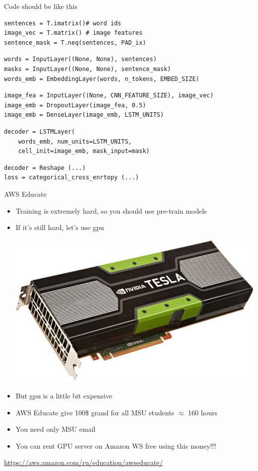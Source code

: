 \documentclass{beamer}
\begin{document}
\begin{frame}[fragile]{Code should be like this}
\begin{verbatim}
sentences = T.imatrix()# word ids
image_vec = T.matrix() # image features
sentence_mask = T.neq(sentences, PAD_ix)
\end{verbatim}
\begin{verbatim}
words = InputLayer((None, None), sentences)
masks = InputLayer((None, None), sentence_mask)
words_emb = EmbeddingLayer(words, n_tokens, EMBED_SIZE)
\end{verbatim}
\begin{verbatim}
image_fea = InputLayer((None, CNN_FEATURE_SIZE), image_vec)
image_emb = DropoutLayer(image_fea, 0.5)
image_emb = DenseLayer(image_emb, LSTM_UNITS)
\end{verbatim}
\begin{verbatim}
decoder = LSTMLayer(
	words_emb, num_units=LSTM_UNITS,
	cell_init=image_emb, mask_input=mask)
\end{verbatim}
\begin{verbatim}
decoder = Reshape (...)
loss = categorical_cross_enrtopy (...)
\end{verbatim}
\end{frame}

\begin{frame}{AWS Educate}
	\begin{itemize}
		\item Training is extremely hard, so you should use pre-train models
		\item If it's still hard, let's use gpu
				\begin{center}
					\includegraphics[scale=0.3]{img/tesla}
				\end{center}
		\item But gpu is a little bit expensive
		\item AWS Educate give 100\$ grand for all MSU students $\approx$ 160 hours
		\item You need only MSU email
		\item You can rent GPU server on Amazon WS free using this money!!!
	\end{itemize}
	\href{https://aws.amazon.com/ru/education/awseducate/}{https://aws.amazon.com/ru/education/awseducate/}
\end{frame}
\end{document}
